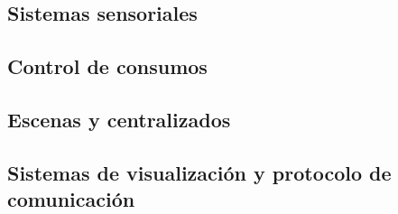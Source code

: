 \subsection{Sistemas sensoriales}
\subsection{Control de consumos}
\subsection{Escenas y centralizados}
\subsection{Sistemas de visualización y protocolo de comunicación}